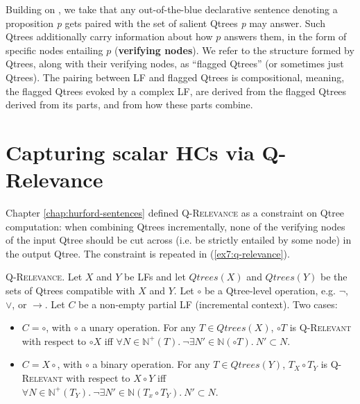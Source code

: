 Building on \citet{Katzir2015,HenotMortier2024a,HenotMortier2024b}, we take that any out-of-the-blue declarative sentence denoting a proposition \textit{p} gets paired with the set of salient Qtrees \textit{p} may answer. Such Qtrees additionally carry information about how $p$ answers them, in the form of specific nodes entailing $p$ (\textbf{verifying nodes}). We refer to the structure formed by Qtrees, along with their verifying nodes, as ``flagged Qtrees'' (or sometimes just Qtrees). The pairing between LF and flagged Qtrees is compositional, meaning, the flagged Qtrees evoked by a complex LF, are derived from the flagged Qtrees derived from its parts, and from how these parts combine. 



\section{Capturing scalar HCs via Q-Relevance}
Chapter \ref{chap:hurford-sentences} defined \textsc{Q-Relevance} as a constraint on Qtree computation: when combining Qtrees incrementally, none of the verifying nodes of the input Qtree should be cut across (i.e. be strictly entailed by some node) in the output Qtree. The constraint is repeated in (\ref{ex7:q-relevance}).


\begin{exe}
	 {\textsc{Q-Relevance}.  Let $X$ and $Y$ be LFs and let $Qtrees(X)$ and $Qtrees(Y)$ be the sets of Qtrees compatible with $X$ and $Y$. Let $\circ$ be a Qtree-level operation, e.g. $\neg$, $\vee$, or $\rightarrow$. Let $C$ be a non-empty partial LF (incremental context). Two cases:
		\begin{itemize}
			\item $C=\circ$, with $\circ$ a unary operation. For any $T \in Qtrees(X)$, $\circ T$ is \textsc{Q-Relevant} with respect to $\circ X$ iff $\forall N \in \mathbb{N}^+(T). \ \neg\exists N' \in \mathbb{N}(\circ T). \ N' \subset N$.
			\item $C = X \circ$, with $\circ$ a binary operation. For any $T \in Qtrees(Y)$, $T_X \circ T_Y$ is \textsc{Q-Relevant} with respect to $X \circ Y$ iff $\forall N \in \mathbb{N}^+(T_Y). \ \neg\exists N' \in \mathbb{N}(T_x \circ T_Y). \ N' \subset N$.
	\end{itemize}}
\end{exe}

\begin{exe}
	\label{ex7:q-relevance-conditional}
\end{exe}

